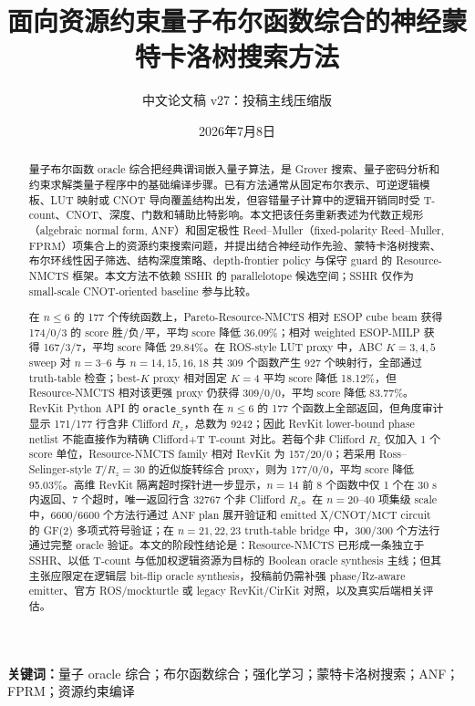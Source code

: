 \documentclass[UTF8,fontset=macnew,11pt]{ctexart}
\title{面向资源约束量子布尔函数综合的神经蒙特卡洛树搜索方法}
\author{中文论文稿 v27：投稿主线压缩版}
\date{2026年7月8日}
\newcommand{\method}{Resource-NMCTS}
\newcommand{\anf}{\ensuremath{\mathrm{ANF}}}
\newcommand{\fprm}{\ensuremath{\mathrm{FPRM}}}
\newcommand{\mct}{\ensuremath{\mathrm{MCT}}}
\begin{document}
\pagestyle{plain}
\maketitle

\begin{abstract}
量子布尔函数 oracle 综合把经典谓词嵌入量子算法，是 Grover 搜索、量子密码分析和约束求解类量子程序中的基础编译步骤。已有方法通常从固定布尔表示、可逆逻辑模板、LUT 映射或 CNOT 导向覆盖结构出发，但容错量子计算中的逻辑开销同时受 T-count、CNOT、深度、门数和辅助比特影响。本文把该任务重新表述为代数正规形（algebraic normal form, \anf{}）和固定极性 Reed--Muller（fixed-polarity Reed--Muller, \fprm{}）项集合上的资源约束搜索问题，并提出结合神经动作先验、蒙特卡洛树搜索、布尔环线性因子筛选、结构深度策略、depth-frontier policy 与保守 guard 的 \method{} 框架。本文方法不依赖 SSHR 的 parallelotope 候选空间；SSHR 仅作为 small-scale CNOT-oriented baseline 参与比较。

在 $n\leq6$ 的 177 个传统函数上，Pareto-\method{} 相对 ESOP cube beam 获得 174/0/3 的 score 胜/负/平，平均 score 降低 36.09\%；相对 weighted ESOP-MILP 获得 167/3/7，平均 score 降低 29.84\%。在 ROS-style LUT proxy 中，ABC $K=3,4,5$ sweep 对 $n=3$--$6$ 与 $n=14,15,16,18$ 共 309 个函数产生 927 个映射行，全部通过 truth-table 检查；best-$K$ proxy 相对固定 $K=4$ 平均 score 降低 18.12\%，但 \method{} 相对该更强 proxy 仍获得 309/0/0，平均 score 降低 83.77\%。RevKit Python API 的 \texttt{oracle\_synth} 在 $n\leq6$ 的 177 个函数上全部返回，但角度审计显示 171/177 行含非 Clifford $R_z$，总数为 9242；因此 RevKit lower-bound phase netlist 不能直接作为精确 Clifford+T T-count 对比。若每个非 Clifford $R_z$ 仅加入 1 个 score 单位，Resource-NMCTS family 相对 RevKit 为 157/20/0；若采用 Ross--Selinger-style $T/R_z=30$ 的近似旋转综合 proxy，则为 177/0/0，平均 score 降低 95.03\%。高维 RevKit 隔离超时探针进一步显示，$n=14$ 前 8 个函数中仅 1 个在 30 s 内返回、7 个超时，唯一返回行含 32767 个非 Clifford $R_z$。在 $n=20$--$40$ 项集级 scale 中，6600/6600 个方法行通过 \anf{} plan 展开验证和 emitted X/CNOT/\mct{} circuit 的 GF(2) 多项式符号验证；在 $n=21,22,23$ truth-table bridge 中，300/300 个方法行通过完整 oracle 验证。本文的阶段性结论是：\method{} 已形成一条独立于 SSHR、以低 T-count 与低加权逻辑资源为目标的 Boolean oracle synthesis 主线；但其主张应限定在逻辑层 bit-flip oracle synthesis，投稿前仍需补强 phase/Rz-aware emitter、官方 ROS/mockturtle 或 legacy RevKit/CirKit 对照，以及真实后端相关评估。
\end{abstract}

\noindent\textbf{关键词：}量子 oracle 综合；布尔函数综合；强化学习；蒙特卡洛树搜索；ANF；FPRM；资源约束编译
\end{document}
